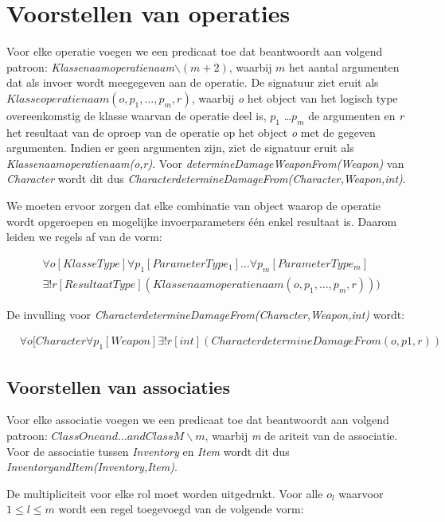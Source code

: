 \section{Voorstellen van operaties}
Voor elke operatie voegen we een predicaat toe dat beantwoordt aan volgend patroon: \textit{Klassenaamoperatienaam$\backslash(m+2)$}, waarbij $m$ het aantal argumenten dat als invoer wordt meegegeven aan de operatie. De signatuur ziet eruit als \\ \textit{$Klasseoperatienaam(o,p_1,\ldots,p_m,r)$}, waarbij \textit{o} het object van het logisch type overeenkomstig de klasse waarvan de operatie deel is, \textit{$p_1$} \ldots \textit{$p_m$} de argumenten en \textit{r} het resultaat van de oproep van de operatie op het object \textit{o} met de gegeven argumenten. Indien er geen argumenten zijn, ziet de signatuur eruit als \textit{Klassenaamoperatienaam(o,r)}. Voor \textit{determineDamageWeaponFrom(Weapon)} van \textit{Character} wordt dit dus \textit{CharacterdetermineDamageFrom(Character,Weapon,int)}.

We moeten ervoor zorgen dat elke combinatie van object waarop de operatie wordt opgeroepen en mogelijke invoerparameters \'e\'en enkel resultaat is. Daarom leiden we regels af van de vorm:

\begin{align*}
	&\forall{o}[KlasseType]\forall{p_1}[ParameterType_1]\ldots\forall{p_m}[ParameterType_m]
	\\
	&\exists!{r}[ResultaatType](Klassenaamoperatienaam(o,p_1,\ldots,p_m,r)))
\end{align*}
	
De invulling voor \textit{CharacterdetermineDamageFrom(Character,Weapon,int)} wordt:
	
\begin{align*}
	&\forall{o}[Character\forall{p_1}[Weapon]\exists!{r}[int](CharacterdetermineDamageFrom(o,p1,r))
\end{align*}

\subsection{Voorstellen van associaties}
Voor elke associatie voegen we een predicaat toe dat beantwoordt aan volgend patroon: \textit{$ClassOneand\ldots{}andClassM\backslash{m}$}, waarbij \textit{m} de ariteit van de associatie. Voor de associatie tussen \textit{Inventory} en \textit{Item} wordt dit dus \textit{InventoryandItem(Inventory,Item)}.

De multipliciteit voor elke rol moet worden uitgedrukt. Voor alle $o_l$ waarvoor $1 \leq l \leq m$ wordt een regel toegevoegd van de volgende vorm:\\

